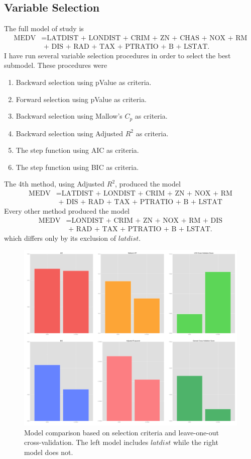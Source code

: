 \documentclass[12pt]{article}
\begin{document}
\subsection{Variable Selection}
The full model of study is
\begin{align*}
\text{MEDV} &= \text{LATDIST + LONDIST + CRIM + ZN + CHAS + NOX + RM} \\
& \text{\ \ + DIS + RAD + TAX + PTRATIO + B + LSTAT.}
\end{align*}
I have run several variable selection procedures in order to select the best submodel.  These procedures were
\begin{enumerate}
\item Backward selection using pValue as criteria.
\item Forward selection using pValue as criteria.
\item Backward selection using Mallow's $C_p$ as criteria.
\item Backward selection using Adjusted $R^2$ as criteria.
\item The step function using AIC as criteria.
\item The step function using BIC as criteria.
\end{enumerate}
The 4th method, using Adjusted $R^2$, produced the model
\begin{align*}
\text{MEDV} &= \text{LATDIST + LONDIST + CRIM + ZN + NOX + RM} \\
& \text{\ \ + DIS + RAD + TAX + PTRATIO + B + LSTAT}
\end{align*}
Every other method produced the model
\begin{align*}
\text{MEDV} &= \text{LONDIST + CRIM + ZN + NOX + RM + DIS} \\
& \text{\ \ + RAD + TAX + PTRATIO + B + LSTAT.}
\end{align*}
which differs only by its exclusion of $latdist$.

\begin{figure}[ht!]
\centering
\includegraphics[width=150mm]{barplots.png}
\caption{Model comparison based on selection criteria and leave-one-out cross-validation.  The left model includes $latdist$ while the right model does not.}
\end{figure}
\end{document}
